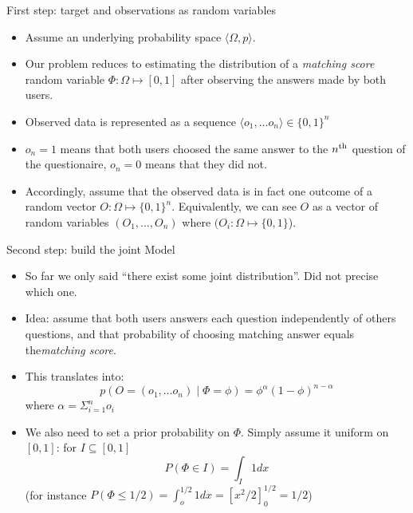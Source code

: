 \documentclass{beamer}
\begin{document}
\begin{frame}{First step: target and observations as random variables}
  \begin{itemize}
  \item Assume an underlying probability space $\langle \Omega, p \rangle$.
  \item Our problem reduces to estimating the distribution of a \emph{matching score} random variable $\Phi: \Omega \mapsto [0, 1]$ after observing the answers made by both users.
  \item Observed data is represented as a sequence $\langle o_1, \dots o_n \rangle \in \{0,1\}^n$
  \item $o_n = 1$ means that both users choosed the same answer to the $n^\textnormal{th}$ question of the questionaire, $o_n = 0$ means that they did not.
  \item Accordingly, assume that the observed data is in fact one outcome of a random vector $O: \Omega \mapsto \{0, 1\}^n$. Equivalently, we can see $O$ as a vector of random variables $(O_1, \dots, O_n)$ where  $(O_i: \Omega \mapsto \{0,1\}$).
  \end{itemize}
    
\end{frame}

\begin{frame}{Second step: build the joint Model}
  \begin{itemize}
  \item So far we only said ``there exist some joint distribution''. Did not precise which one.
  \item Idea: assume that both users answers each question independently of others questions, and that probability of choosing matching answer equals the\emph{matching score}.
  \item This translates into: \[ p(O = (o_1, \dots o_n) \mid \Phi = \phi) = \phi^\alpha (1-\phi)^{n-\alpha} \] where $\alpha = \Sigma_{i=1}^n o_i$
  \item We also need to set a prior probability on $\Phi$. Simply assume it uniform on $[0,1]$: for $I \subseteq [0,1]$ \[P(\Phi \in I) = \int_I 1 dx\]
    (for instance $P(\Phi \le 1/2) = \int_o^{1/2} 1 dx =  [x^2/2]^{1/2}_{0} = 1/2$)
  \end{itemize}
\end{frame}
\end{document}
